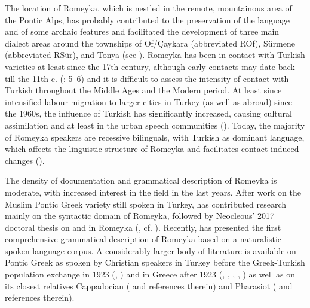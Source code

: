\documentclass[output=paper,colorlinks,citecolor=brown]{langscibook}
\begin{document}
The location of Romeyka, which is nestled in the remote, mountainous area of the Pontic Alps, has probably contributed to the preservation of the language and of some archaic features and facilitated the development of three main dialect areas around the townships of Of/Çaykara (abbreviated ROf), Sürmene (abbreviated RSür), and Tonya (see \citealt{schreibergrammar2022}). Romeyka has been in contact with Turkish varieties at least since the 17th century, although early contacts may date back till the 11th c. (\citealt{drettasPontic1997}: 5--6) and it is difficult to assess the intensity of contact with Turkish throughout the Middle Ages and the Modern period. At least since intensified labour migration to larger cities in Turkey (as well as abroad) since the 1960s, the influence of Turkish has significantly increased, causing cultural assimilation and  at least in the urban speech communities (\citealt{schreiberSitaridou2017assessing}). Today, the majority of Romeyka speakers are recessive bilinguals, with Turkish as dominant language, which affects the linguistic structure of Romeyka and facilitates contact-induced changes (\citealt{schreibergrammar2022}).

The density of documentation and grammatical description of Romeyka is moderate, with increased interest in the field in the last years. After  work on the Muslim Pontic Greek variety still spoken in Turkey, \citet{sitaridouINF2014,sitaridouGSEnclaves2013,sitaridouModality2014,sitaridouReframing2016,sitaridouVulnerabke2021} has contributed research mainly on the syntactic domain of Romeyka, followed by Neocleous' 2017 doctoral thesis on  and  in Romeyka (\citealt{neocleous_word_2020}, cf. \citealt {neocleousEvolution2022}). Recently, \citet{schreibergrammar2022} has presented the first comprehensive grammatical description of Romeyka based on a naturalistic spoken language corpus. A considerably larger body of literature is available on Pontic Greek as spoken by Christian speakers in Turkey before the Greek-Turkish population exchange in 1923 (\citealt{deffner1878}, \citealt{parcharidis1880,parcharidis1888}) and in Greece after 1923 (\citealt{dawkins1931,dawkins1937}, \citealt{papadopoulos1933,papadopoulos1955,papadopoulos1958-1961}, \citealt{tombaidis1992,tombaidis1996}, \citealt{drettasPontic1997,drettas1999}, \citealt{revithiadouSpyropoulos2009}) as well as on its closest relatives Cappadocian (\citealt{janseCappadocian2023} and references therein) and Pharasiot  (\citealt{bagriacik_pharasiot_2018} and references therein).
\end{document}
